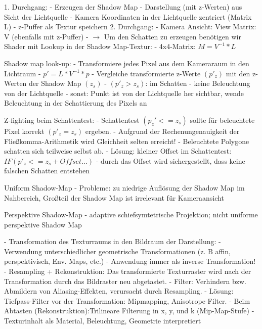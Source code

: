 \documentclass[10pt,landscape]{article}
\makeatletter
\renewcommand{\subsection}{\@startsection{subsection}{2}{0mm}%
                                {-1explus -.5ex minus -.2ex}%
                                {0.5ex plus .2ex}%
                                {\normalfont\normalsize\bfseries}}
\makeatother
\begin{document}
\begin{multicols}{3}
  1. Durchgang: 
  - Erzeugen der Shadow Map
  - Darstellung (mit z-Werten) aus Sicht der Lichtquelle
  - Kamera Koordinaten in der Lichtquelle zentriert (Matrix L)
  - z-Puffer als Textur speichern
  2. Durchgang:
  - Kamera Ansicht: View Matrix: V (ebenfalls mit z-Puffer)
  - $\rightarrow$ Um den Schatten zu erzeugen benötigen wir Shader mit Lookup in der Shadow Map-Textur:
  - 4x4-Matrix: $M = V^{-1}*L$
  
  
  Shadow map look-up:
  - Transformiere jedes Pixel aus dem Kameraraum in den Lichtraum
  - $p'=L*V^{-1}*p$
  - Vergleiche transformierte z-Werte $(p'_z)$ mit den z-Werten der Shadow Map $(z_s)$
  - $(p'_z>z_s)$: im Schatten - keine Beleuchtung von der Lichtquelle
  - sonst: Punkt ist von der Lichtquelle her sichtbar, wende Beleuchtung in der Schattierung des Pixels an
  
  Z-fighting beim Schattentest:
  - Schattentest $(p_z' <= z_s )$ sollte für beleuchtete Pixel korrekt $(p'_z = z_s)$ ergeben.
  - Aufgrund der Rechenungenauigkeit der Fließkomma-Arithmetik wird Gleichheit selten erreicht!
  - Beleuchtete Polygone schatten sich teilweise selbst ab.
  - Lösung: kleiner Offset im Schattentest: $IF (p'_z <= z_s + Offset...)$
  - durch das Offset wird sichergestellt, dass keine falschen Schatten entstehen
  
  Uniform Shadow-Map
  - Probleme: zu niedrige Auflösung der Shadow Map im Nahbereich, Großteil der Shadow Map ist irrelevant für Kameraansicht
  
  Perspektive Shadow-Map
  - adaptive schiefsymtetrische Projektion; nicht uniforme perspektive Shadow Map
  
  - Transformation des Texturraums in den Bildraum der Darstellung: 
  - Verwendung unterschiedlicher geometrische Transformationen (z. B affin, perspektivisch, Env. Maps, etc.) 
  - Anwendung immer als inverse Transformation!
  - Resampling + Rekonstruktion: Das transformierte Texturraster wird nach der Transformation durch das Bildraster neu abgetastet.
  - Filter: Verhindern bzw. Abmildern von Aliasing-Effekten, verursacht durch Resampling.
  - Lösung: Tiefpass-Filter vor der Transformation: Mipmapping, Anisotrope Filter.
  - Beim Abtasten (Rekonstruktion):Trilineare Filterung in x, y, und k (Mip-Map-Stufe)
  - Texturinhalt als Material, Beleuchtung, Geometrie interpretiert
  
  
  
\end{multicols}
\end{document}
